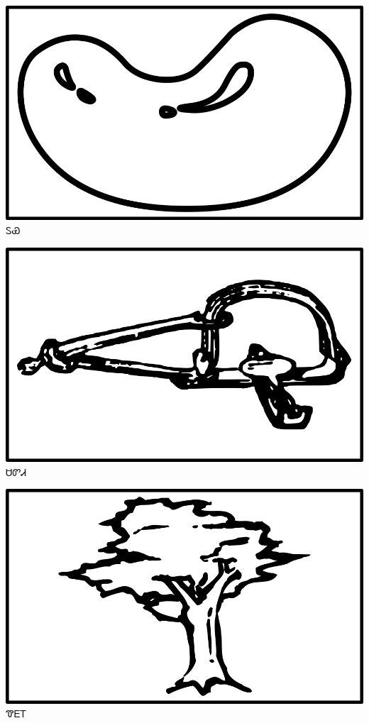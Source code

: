 \documentclass[avery5371]{flashcards}%
\begin{document}
    \begin{flashcard}{
        \includegraphics[width=0.95\columnwidth,height=.51\columnwidth,keepaspectratio]{../artwork/objects-neutral/tuya}
    }
        \Huge ᏚᏯ
    \end{flashcard}

    \begin{flashcard}{
        \includegraphics[width=0.95\columnwidth,height=.51\columnwidth,keepaspectratio]{../artwork/objects-neutral/sadvdi}
    }
        \Huge ᏌᏛᏗ
    \end{flashcard}

    \begin{flashcard}{
        \includegraphics[width=0.95\columnwidth,height=.51\columnwidth,keepaspectratio]{../artwork/objects-rod/hlgv}
    }
        \Huge ᏡᎬᎢ
    \end{flashcard}
\end{document}
